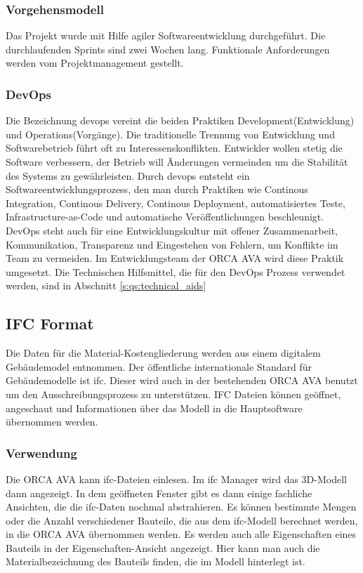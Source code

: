 \subsubsection{Vorgehensmodell}
\label{s:basics:project-management:procedure_model}
Das Projekt wurde mit Hilfe agiler Softwareentwicklung durchgeführt. Die durchlaufenden Sprints sind zwei Wochen lang. Funktionale Anforderungen werden vom Projektmanagement gestellt.

\subsubsection{DevOps}
\label{s:basics:project-management:devops}
Die Bezeichnung \ac{devops} vereint die beiden Praktiken \glqq Development\grqq{}(Entwicklung) und \glqq Operations\grqq{}(Vorgänge). Die traditionelle Trennung von Entwicklung und Softwarebetrieb führt oft zu
Interessenskonflikten. Entwickler wollen stetig die Software verbessern, der Betrieb will Änderungen vermeinden um die Stabilität des Systems zu gewährleisten. Durch \ac{devops} entsteht ein Softwareentwicklungsprozess, den man durch Praktiken wie Continous Integration, Continous Delivery, Continous Deployment, automatisiertes Teste, Infrastructure-as-Code und automatische Veröffentlichungen beschleunigt. DevOps steht auch für eine Entwicklungskultur mit offener Zusammenarbeit, Kommunikation, Transparenz und Eingestehen von Fehlern, um Konflikte im Team zu vermeiden. Im Entwicklungsteam der ORCA AVA wird diese Praktik umgesetzt.
Die Technischen Hilfsmittel, die für den DevOps Prozess verwendet werden, sind in Abschnitt \ref{s:qs:technical_aids} \citep{devops_2021}

\subsection{IFC Format}
\label{s:basics:ifc}
Die Daten für die Material-Kostengliederung werden aus einem digitalem Gebäudemodel entnommen. Der öffentliche internationale Standard für Gebäudemodelle ist \ac{ifc}. \citep{BuildingSMART_International_Ltd2017-gs} Dieser wird auch in der bestehenden ORCA AVA benutzt um den Ausschreibungsprozess zu unterstützen. IFC Dateien können geöffnet, angeschaut und Informationen über das Modell in die Hauptsoftware übernommen werden.

\subsubsection{Verwendung}
\label{s:basics:ifc:usage}
Die ORCA AVA kann \ac{ifc}-Dateien einlesen. Im \ac{ifc} Manager wird das 3D-Modell dann angezeigt. In dem geöffneten Fenster gibt es dann einige fachliche Ansichten, die die \ac{ifc}-Daten nochmal abstrahieren. Es können bestimmte Mengen oder die Anzahl verschiedener Bauteile, die aus dem \ac{ifc}-Modell berechnet werden, in die ORCA AVA übernommen werden.
Es werden auch alle Eigenschaften eines Bauteils in der Eigenschaften-Ansicht angezeigt. Hier kann man auch die Materialbezeichnung des Bauteils finden, die im Modell hinterlegt ist.

